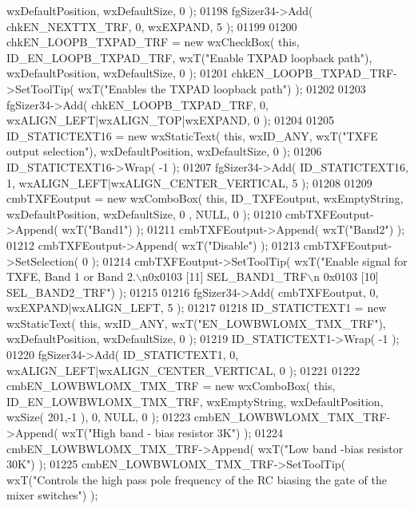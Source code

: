 \begin{DoxyCode}
      wxDefaultPosition, wxDefaultSize, 0 );
01198     fgSizer34->Add( chkEN_NEXTTX_TRF, 0, wxEXPAND, 5 );
01199     
01200     chkEN_LOOPB_TXPAD_TRF = \textcolor{keyword}{new} wxCheckBox( \textcolor{keyword}{this}, ID_EN_LOOPB_TXPAD_TRF, wxT(\textcolor{stringliteral}{"Enable TXPAD loopback path"}),
       wxDefaultPosition, wxDefaultSize, 0 );
01201     chkEN_LOOPB_TXPAD_TRF->SetToolTip( wxT(\textcolor{stringliteral}{"Enables the TXPAD loopback path"}) );
01202     
01203     fgSizer34->Add( chkEN_LOOPB_TXPAD_TRF, 0, wxALIGN\_LEFT|wxALIGN\_TOP|wxEXPAND, 0 );
01204     
01205     ID_STATICTEXT16 = \textcolor{keyword}{new} wxStaticText( \textcolor{keyword}{this}, wxID\_ANY, wxT(\textcolor{stringliteral}{"TXFE output selection"}), wxDefaultPosition, 
      wxDefaultSize, 0 );
01206     ID_STATICTEXT16->Wrap( -1 );
01207     fgSizer34->Add( ID_STATICTEXT16, 1, wxALIGN\_LEFT|wxALIGN\_CENTER\_VERTICAL, 5 );
01208     
01209     cmbTXFEoutput = \textcolor{keyword}{new} wxComboBox( \textcolor{keyword}{this}, ID_TXFEoutput, wxEmptyString, wxDefaultPosition, wxDefaultSize, 0
      , NULL, 0 );
01210     cmbTXFEoutput->Append( wxT(\textcolor{stringliteral}{"Band1"}) );
01211     cmbTXFEoutput->Append( wxT(\textcolor{stringliteral}{"Band2"}) );
01212     cmbTXFEoutput->Append( wxT(\textcolor{stringliteral}{"Disable"}) );
01213     cmbTXFEoutput->SetSelection( 0 );
01214     cmbTXFEoutput->SetToolTip( wxT(\textcolor{stringliteral}{"Enable signal for TXFE, Band 1 or Band 2.\(\backslash\)n0x0103 [11] SEL\_BAND1\_TRF\(\backslash\)n
      0x0103 [10] SEL\_BAND2\_TRF"}) );
01215     
01216     fgSizer34->Add( cmbTXFEoutput, 0, wxEXPAND|wxALIGN\_LEFT, 5 );
01217     
01218     ID_STATICTEXT1 = \textcolor{keyword}{new} wxStaticText( \textcolor{keyword}{this}, wxID\_ANY, wxT(\textcolor{stringliteral}{"EN\_LOWBWLOMX\_TMX\_TRF"}), wxDefaultPosition, 
      wxDefaultSize, 0 );
01219     ID_STATICTEXT1->Wrap( -1 );
01220     fgSizer34->Add( ID_STATICTEXT1, 0, wxALIGN\_LEFT|wxALIGN\_CENTER\_VERTICAL, 0 );
01221     
01222     cmbEN_LOWBWLOMX_TMX_TRF = \textcolor{keyword}{new} wxComboBox( \textcolor{keyword}{this}, ID_EN_LOWBWLOMX_TMX_TRF, wxEmptyString, 
      wxDefaultPosition, wxSize( 201,-1 ), 0, NULL, 0 );
01223     cmbEN_LOWBWLOMX_TMX_TRF->Append( wxT(\textcolor{stringliteral}{"High band - bias resistor 3K"}) );
01224     cmbEN_LOWBWLOMX_TMX_TRF->Append( wxT(\textcolor{stringliteral}{"Low band -bias resistor 30K"}) );
01225     cmbEN_LOWBWLOMX_TMX_TRF->SetToolTip( wxT(\textcolor{stringliteral}{"Controls the high pass pole frequency of the RC biasing the
       gate of the mixer switches"}) );

\end{DoxyCode}
